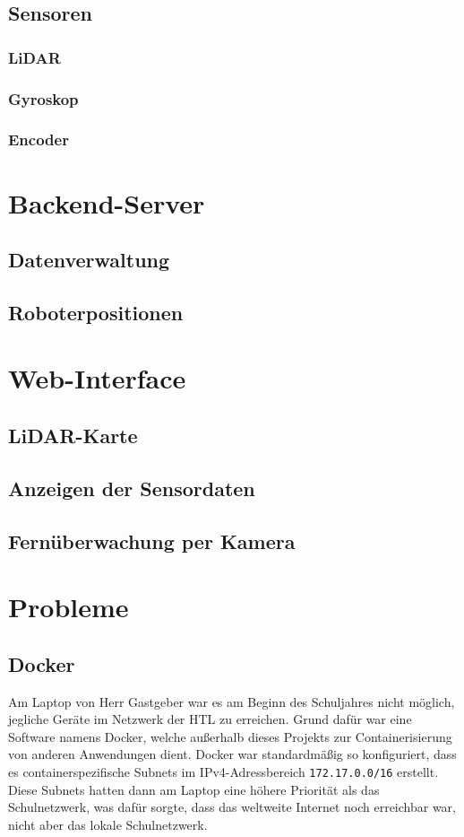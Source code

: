 \documentclass[12pt]{article}
\begin{document}
	\subsection{Sensoren}
	\subsubsection{LiDAR}
	\label{lidar}
	\subsubsection{Gyroskop}
	\subsubsection{Encoder}
	\section{Backend-Server}
	\subsection{Datenverwaltung}
	\subsection{Roboterpositionen}
	\section{Web-Interface}
	\subsection{LiDAR-Karte}
	\subsection{Anzeigen der Sensordaten}
	\subsection{Fernüberwachung per Kamera}
	\section{Probleme}
	\subsection{Docker}
	Am Laptop von Herr Gastgeber war es am Beginn des Schuljahres nicht möglich,
	jegliche Geräte im Netzwerk der HTL zu erreichen.
	Grund dafür war eine Software namens Docker,
	welche außerhalb dieses Projekts zur Containerisierung von anderen Anwendungen dient.
	Docker war standardmäßig so konfiguriert,
	dass es containerspezifische Subnets im IPv4-Adressbereich \verb|172.17.0.0/16| erstellt.
	Diese Subnets hatten dann am Laptop eine höhere Priorität als das Schulnetzwerk,
	was dafür sorgte,
	dass das weltweite Internet noch erreichbar war, 
	nicht aber das lokale Schulnetzwerk.

	\newpage
	\begin{appendix}
		\listoffigures
		\listoftables
	\end{appendix}
	\vspace{1cm}
\end{document}
